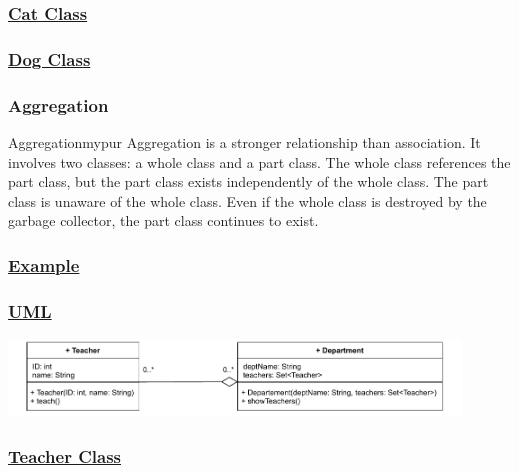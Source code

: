 \subsubsection*{\underline{Cat Class}}


\subsubsection*{\underline{Dog Class}}


\subsubsection*{Aggregation}

\begin{prettyBox}{Aggregation}{mypur}
Aggregation is a stronger relationship than association. It involves two classes: a whole class and a part class. The whole class references the part class, but the part class exists independently of the whole class. The part class is unaware of the whole class. Even if the whole class is destroyed by the garbage collector, the part class continues to exist.
\end{prettyBox}

\subsubsection*{\underline{Example}}

\subsubsection*{\underline{UML}}

\begin{center}
\includegraphics[width=0.9\textwidth]{Chapters/Diagram/OOP/EX5/ex5.drawio.pdf}
\end{center}


\subsubsection*{\underline{Teacher Class}}


